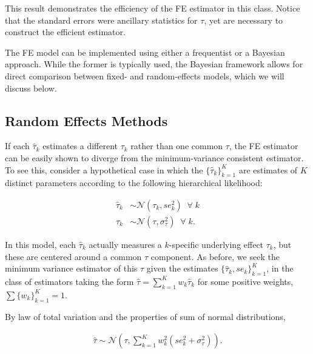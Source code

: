 \documentclass[12pt]{article}
\begin{document}
This result demonstrates the efficiency of the FE estimator in this class. Notice that the standard errors were ancillary statistics for $\tau$, yet are necessary to construct the efficient estimator. 

The FE model can be implemented using either a frequentist or a Bayesian approach. While the former is typically used, the Bayesian framework allows for direct comparison between fixed- and random-effects models, which we will discuss below. 



\subsection{Random Effects Methods}


If each $\hat{\tau}_k$ estimates a different $\tau_k$ rather than one common $\tau$, the FE estimator can be easily shown to diverge from the minimum-variance consistent estimator. To see this, consider a hypothetical case in which the $\{\hat{\tau}_k\}_{k=1}^K$ are estimates of $K$ distinct parameters according to the following hierarchical likelihood:

\begin{equation}\label{rubin}
\begin{aligned}
\hat{\tau}_k &\sim \mathcal{N}(\tau_k, se^2_{k}) \; \; \forall \;k\\
\tau_k &\sim \mathcal{N}(\tau, \sigma^2_{\tau}) \; \; \forall\; k.
\end{aligned}
\end{equation}

In this model, each $\hat{\tau}_k$ actually measures a $k$-specific underlying effect $\tau_k$, but these are centered around a common $\tau$ component. As before, we seek the minimum variance estimator of this $\tau$ given the estimates $\{\hat{\tau}_k, se_k\}_{k=1}^K$, in the class of estimators taking the form  $\hat{\tau} = \sum_{k=1}^{K} w_k \hat{\tau}_k$ for some positive weights, $\sum \{w_k\}_{k=1}^K =1$. 

By law of total variation and the properties of sum of normal distributions,

\begin{equation}
\begin{aligned}
\hat{\tau} \sim \mathcal{N}(\tau, \sum_{k=1}^{K} w_k^2( se^2_{k} + \sigma^2_{\tau})).
\end{aligned}
\end{equation}
\end{document}
